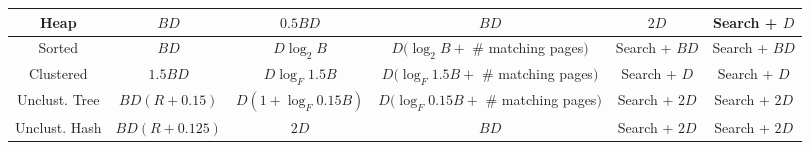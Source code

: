\documentclass[landscape,8pt]{extarticle}
\begin{document}
\begin{multicols}{4}
\begin{center}
\begin{adjustbox}{angle=270}
\begin{tabular}{ | c | c | c | c | c | c | }
                Heap          & $BD$          & $0.5 BD$              & $BD$                                     & $2D$          & Search + $D$  \\ \midrule
                Sorted        & $BD$          & $D \log_2 B$          & $D(\log_2 B +$ \# matching pages$)$      & Search + $BD$ & Search + $BD$ \\ \midrule
                Clustered     & $1.5 BD$      & $D \log_F 1.5 B$      & $D(\log_F 1.5B + $ \# matching pages$)$  & Search + $D$  & Search + $D$  \\ \midrule
                Unclust. Tree & $BD(R+0.15)$  & $D(1 + \log_F 0.15B)$ & $D(\log_F 0.15B + $ \# matching pages$)$ & Search + $2D$ & Search + $2D$ \\ \midrule
                Unclust. Hash & $BD(R+0.125)$ & $2D$                  & $BD$                                     & Search + $2D$ & Search + $2D$ \\ \bottomrule
            \end{tabular}
        \end{adjustbox}
    \end{center}
\end{multicols}
\end{document}
